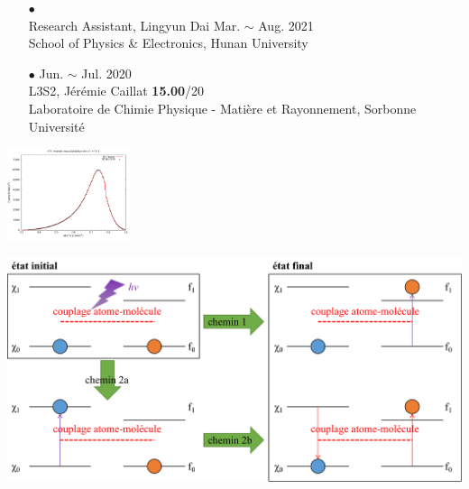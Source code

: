 \begin{frame}
\begin{minipage}{0.88\linewidth}
\begin{itemize}
	\normalsize
	\item[$\bullet$]  \\
	Research Assistant, Lingyun Dai \hfill Mar. $\sim$ Aug. 2021 \\
	\small{School of Physics \& Electronics, Hunan University}
	
	\normalsize
	\item[$\bullet$]  \hfill Jun. $\sim$ Jul. 2020 \\
	L3S2, Jérémie Caillat \hfill \textbf{15.00}/20 \\
	\small{Laboratoire de Chimie Physique - Matière et Rayonnement, Sorbonne Université}
	
	\end{itemize}


	\end{minipage}
	
	\bigskip
	
	
	\begin{minipage}{0.45\linewidth}
	\begin{center}
		\includegraphics[width = 3.6cm]{figs/spec_pp18_290.png}
	\end{center}
	\end{minipage}
	\begin{minipage}{0.1\linewidth}
	\end{minipage}
	\begin{minipage}{0.5\linewidth}
	\begin{center}
		\includegraphics[height = 2.5 cm]{figs/vibicd2.png}
	\end{center}
	\end{minipage}
		
		
	
\end{frame}